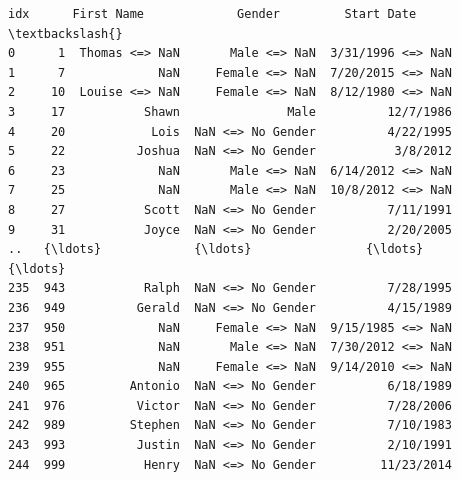 \documentclass [oneside,10pt,a4paper,ngerman,BCOR10mm,headsepline,parindent,final]{scrartcl}
\makeatletter
\newcommand{\boxspacing}{\kern\kvtcb@left@rule\kern\kvtcb@boxsep}
\newcommand{\prompt}[4]{
        {\ttfamily\llap{{\color{#2}[#3]:\hspace{3pt}#4}}\vspace{-\baselineskip}}
    }
\makeatother
\begin{document}
            \begin{tcolorbox}[breakable, size=fbox, boxrule=.5pt, pad at break*=1mm, opacityfill=0]
\prompt{Out}{outcolor}{52}{\boxspacing}
\begin{Verbatim}[commandchars=\\\{\}]
     idx      First Name             Gender         Start Date  \textbackslash{}
0      1  Thomas <=> NaN       Male <=> NaN  3/31/1996 <=> NaN
1      7             NaN     Female <=> NaN  7/20/2015 <=> NaN
2     10  Louise <=> NaN     Female <=> NaN  8/12/1980 <=> NaN
3     17           Shawn               Male          12/7/1986
4     20            Lois  NaN <=> No Gender          4/22/1995
5     22          Joshua  NaN <=> No Gender           3/8/2012
6     23             NaN       Male <=> NaN  6/14/2012 <=> NaN
7     25             NaN       Male <=> NaN  10/8/2012 <=> NaN
8     27           Scott  NaN <=> No Gender          7/11/1991
9     31           Joyce  NaN <=> No Gender          2/20/2005
..   {\ldots}             {\ldots}                {\ldots}                {\ldots}
235  943           Ralph  NaN <=> No Gender          7/28/1995
236  949          Gerald  NaN <=> No Gender          4/15/1989
237  950             NaN     Female <=> NaN  9/15/1985 <=> NaN
238  951             NaN       Male <=> NaN  7/30/2012 <=> NaN
239  955             NaN     Female <=> NaN  9/14/2010 <=> NaN
240  965         Antonio  NaN <=> No Gender          6/18/1989
241  976          Victor  NaN <=> No Gender          7/28/2006
242  989         Stephen  NaN <=> No Gender          7/10/1983
243  993          Justin  NaN <=> No Gender          2/10/1991
244  999           Henry  NaN <=> No Gender         11/23/2014


\end{Verbatim}
\end{tcolorbox}
\end{document}
